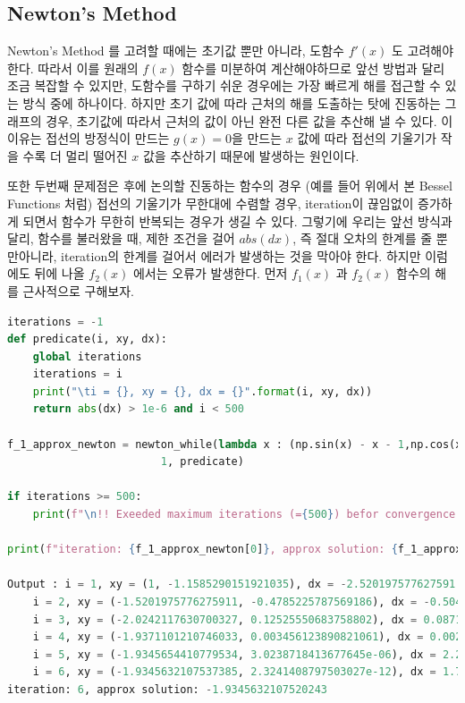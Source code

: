 \documentclass[11pt]{article}
\begin{document}
\subsection{Newton's Method} 


Newton's Method 를 고려할 때에는 초기값 뿐만 아니라, 도함수 $f'(x)$ 도 고려해야 한다. 따라서 이를 원래의 $f(x)$ 함수를 미분하여 계산해야하므로 앞선 방법과 달리 조금 복잡할 수 있지만, 도함수를 구하기 쉬운 경우에는 가장 빠르게 해를 접근할 수 있는 방식 중에 하나이다. 하지만 초기 값에 따라 근처의 해를 도출하는 탓에 진동하는 그래프의 경우, 초기값에 따라서 근처의 값이 아닌 완전 다른 값을 추산해 낼 수 있다. 이 이유는 접선의 방정식이 만드는 $g(x) = 0$을 만드는 $x$ 값에 따라 접선의 기울기가 작을 수록 더 멀리 떨어진 $x$ 값을 추산하기 때문에 발생하는 원인이다. 

또한 두번째 문제점은 후에 논의할 진동하는 함수의 경우 (예를 들어 위에서 본 Bessel Functions 처럼) 접선의 기울기가 무한대에 수렴할 경우, iteration이 끊임없이 증가하게 되면서 함수가 무한히 반복되는 경우가 생길 수 있다. 그렇기에 우리는 앞선 방식과 달리, 함수를 불러왔을 때, 제한 조건을 걸어 $abs(dx)$, 즉 절대 오차의 한계를 줄 뿐만아니라, iteration의 한계를 걸어서 에러가 발생하는 것을 막아야 한다. 하지만 이럼에도 뒤에 나올 $f_2(x)$ 에서는 오류가 발생한다. 먼저 $f_1(x)$ 과  $f_2(x)$ 함수의 해를 근사적으로 구해보자.
\vspace{5mm}

\begin{lstlisting}[language=Python]
iterations = -1
def predicate(i, xy, dx):
    global iterations
    iterations = i
    print("\ti = {}, xy = {}, dx = {}".format(i, xy, dx))
    return abs(dx) > 1e-6 and i < 500 

f_1_approx_newton = newton_while(lambda x : (np.sin(x) - x - 1,np.cos(x)-1), 
                        1, predicate)

if iterations >= 500:
    print(f"\n!! Exeeded maximum iterations (={500}) befor convergence !!")
    
print(f"iteration: {f_1_approx_newton[0]}, approx solution: {f_1_approx_newton[1]}")

Output : i = 1, xy = (1, -1.1585290151921035), dx = -2.520197577627591
	i = 2, xy = (-1.5201975776275911, -0.4785225787569186), dx = -0.5040141854424416
	i = 3, xy = (-2.0242117630700327, 0.12525550683758802), dx = 0.08710164199542941
	i = 4, xy = (-1.9371101210746033, 0.003456123890821061), dx = 0.002544679996650069
	i = 5, xy = (-1.9345654410779534, 3.0238718413677645e-06), dx = 2.230324214770129e-06
	i = 6, xy = (-1.9345632107537385, 2.3241408797503027e-12), dx = 1.7142246509540634e-12
iteration: 6, approx solution: -1.9345632107520243
\end{lstlisting}
\end{document}
